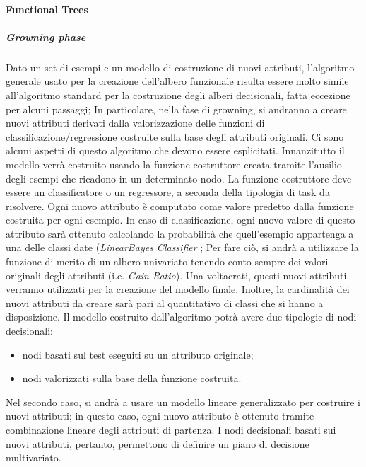 \paragraph{Functional Trees}
\subparagraph{Growning phase}
	Dato un set di esempi e un modello di costruzione di nuovi attributi, l'algoritmo generale usato per la creazione dell'albero funzionale risulta essere molto simile all'algoritmo standard per la costruzione degli alberi decisionali, fatta eccezione per alcuni passaggi; In particolare, nella fase di growning, si andranno a creare nuovi attributi derivati dalla valorizzazione delle funzioni di classificazione/regressione costruite sulla base degli attributi originali. Ci sono alcuni aspetti di questo algoritmo che devono essere esplicitati. Innanzitutto il modello verrà costruito usando la funzione costruttore creata tramite l'ausilio degli esempi che ricadono in un determinato nodo. La funzione costruttore deve essere un classificatore o un regressore, a seconda della tipologia di task da risolvere. Ogni nuovo attributo è computato come valore predetto dalla funzione costruita per ogni esempio. In caso di classificazione, ogni nuovo valore di questo attributo sarà ottenuto calcolando la probabilità che quell'esempio appartenga a una delle classi date (\emph{LinearBayes Classifier} \cite{DBLP:conf/sbia/Gama00}; Per fare ciò, si andrà a utilizzare la funzione di merito di un albero univariato tenendo conto sempre dei valori originali degli attributi (i.e. \emph{Gain Ratio}). Una voltacrati, questi nuovi attributi verranno utilizzati per la creazione del modello finale. Inoltre, la cardinalità dei nuovi attributi da creare sarà pari al quantitativo di classi che si hanno a disposizione.
	Il modello costruito dall'algoritmo potrà avere due tipologie di nodi decisionali: 
	\begin{itemize}
		\item nodi basati sul test eseguiti su un attributo originale;
		\item nodi valorizzati sulla base della funzione costruita.
	\end{itemize} 
	Nel secondo caso, si andrà a usare un modello lineare generalizzato per costruire i nuovi attributi; in questo caso, ogni nuovo attributo è ottenuto tramite combinazione lineare degli attributi di partenza. I nodi decisionali basati sui nuovi attributi, pertanto, permettono di definire un piano di decisione multivariato.


